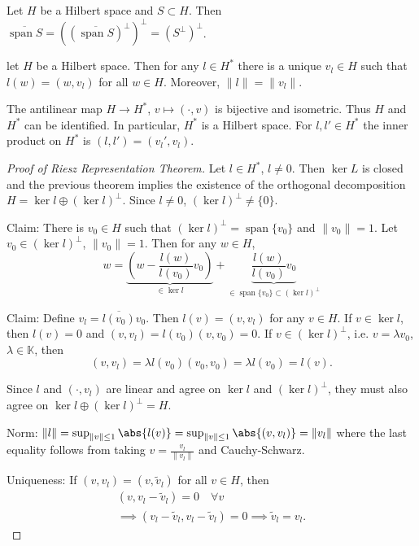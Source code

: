 \documentclass{article}
\newcommand{\K}{\mathbb{K}}
\DeclareMathOperator{\spn}{span}
\begin{document}
\begin{cor}
    Let $H$ be a Hilbert space and $S \subset H$.
    Then $\overline{\spn S} = ((\overline{\spn S})^\perp)^\perp  = (S^\perp)^\perp$.
\end{cor}

\begin{thm}
    let $H$ be a Hilbert space.
    Then for any $l \in H^*$ there is a unique $v_l \in H$ such that $l(w) = (w, v_l)$ for all $w \in H$.
    Moreover, $\|l\| = \|v_l\|$.
\end{thm}

\begin{cor}
    The antilinear map $H \to H^*$, $v \mapsto (\cdot, v)$ is bijective and isometric.
    Thus $H$ and $H^*$ can be identified.
    In particular, $H^*$ is a Hilbert space.
    For $l, l' \in H^*$ the inner product on $H^*$ is $(l, l') = (v_l', v_l)$.
\end{cor}

\begin{proof}[Proof of Riesz Representation Theorem]
    Let $l \in H^*$, $l \neq 0$. Then $\ker L$ is closed and the previous theorem implies the existence of the orthogonal decomposition $H = \ker l \oplus (\ker l)^\perp$.
    Since $l \neq 0$, $(\ker l)^\perp \neq \{0\}$.

    Claim: There is $v_0 \in H$ such that $(\ker l)^\perp = \spn \{v_0\}$ and $\|v_0\| = 1$.
    Let $v_0 \in (\ker l)^\perp$, $\|v_0\| = 1$. Then for any $w \in H$,
    \begin{equation*}
        w = \underbrace{\left(w - \frac{l(w)}{l(v_0)} v_0\right)}_{\in \ker l} + \underbrace{\frac{l(w)}{l(v_0)} v_0}_{\in \spn \{v_0\} \subset (\ker l)^\perp}
    \end{equation*}

    Claim: Define $v_l = \overline{l(v_0)} v_0$.
    Then $l(v) = (v, v_l)$ for any $v \in H$.
    If $v \in \ker l$, then $l(v) = 0$ and $(v, v_l) = l(v_0) (v,v_0) = 0$.
    If $v \in (\ker l)^\perp$, i.e. $v = \lambda v_0$, $\lambda \in \K$, then
    \begin{equation*}
        (v, v_l) = \lambda l(v_0) (v_0, v_0) = \lambda l(v_0) = l(v).
    \end{equation*}

    Since $l$ and $(\cdot, v_l)$ are linear and agree on $\ker l$ and $(\ker l)^\perp$, they must also agree on $\ker l \oplus (\ker l)^\perp = H$.

    Norm: $\|l\| = \sup_{\|v\| \leq 1} \abs{l(v)} = \sup_{\|v\| \leq 1} \abs{(v, v_l)} = \|v_l\|$
    where the last equality follows from taking $v = \frac{v_l}{\|v_l\|}$ and Cauchy-Schwarz.

    Uniqueness: If $(v, v_l) = (v, \tilde{v}_l)$ for all $v \in H$, then
    \begin{align*}
        (v, v_l - \tilde{v}_l) = 0 \quad \forall v \\
        \implies (v_l - \tilde{v}_l, v_l - \tilde{v}_l) = 0 \implies \tilde{v}_l = v_l.
    \end{align*}
\end{proof}
\end{document}
